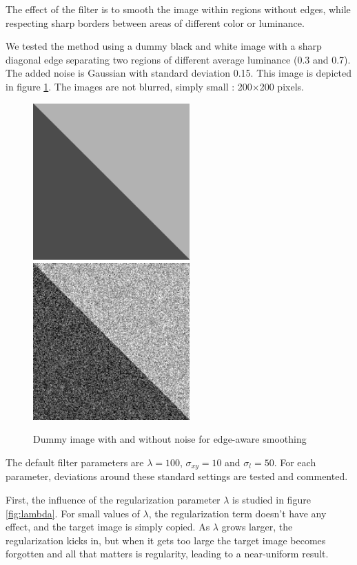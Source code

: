 \documentclass{article}
\begin{document}
The effect of the filter is to smooth the image within regions without edges, while respecting sharp borders between areas of different color or luminance.

\medskip

We tested the method using a dummy black and white image with a sharp diagonal edge separating two regions of different average luminance (0.3 and 0.7). The added noise is Gaussian with standard deviation 0.15. This image is depicted in figure \ref{fig:dummy}. The images are not blurred, simply small : 200$\times$200 pixels.

\begin{figure}
    \centering
    \includegraphics[width=6cm]{../code/results/smoothing_diag_basis.png}
    \hspace{1cm}
    \includegraphics[width=6cm]{../code/results/smoothing_diag_basis_noisy.png}
    \caption{Dummy image with and without noise for edge-aware smoothing}
    \label{fig:dummy}
\end{figure}

The default filter parameters are $\lambda = 100$, $\sigma_{xy} = 10$ and $\sigma_l = 50$. For each parameter, deviations around these standard settings are tested and commented.

\medskip

First, the influence of the regularization parameter $\lambda$ is studied in figure \ref{fig:lambda}. For small values of $\lambda$, the regularization term doesn't have any effect, and the target image is simply copied. As $\lambda$ grows larger, the regularization kicks in, but when it gets too large the target image becomes forgotten and all that matters is regularity, leading to a near-uniform result.
\end{document}
